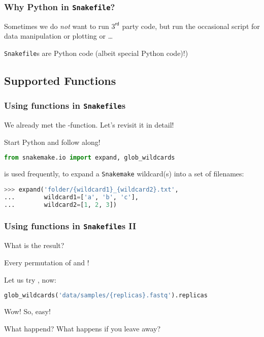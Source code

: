 \begin{frame}
  \frametitle{Why Python in \texttt{Snakefile}?}
  Sometimes we do \emph{not} want to run $3^{\mathsf{rd}}$ party code, but run the occasional script for data manipulation   or plotting or \ldots 
  \pause
  \begin{docs}
  	\texttt{Snakefile}s are Python code (albeit special Python code)!)
  \end{docs}
\end{frame}

\subsection{Supported Functions}

\begin{frame}[fragile]
  \frametitle{Using functions in \texttt{Snakefile}s}
  We already met the -function. Let's revisit it in detail!
  \begin{task}
  	Start Python and follow along!
  \end{task}
  \begin{lstlisting}[language=Python,style=Python]
from snakemake.io import expand, glob_wildcards
  \end{lstlisting}
    is used frequently, to expand a \texttt{Snakemake} wildcard(s) into a set of filenames:
  \begin{lstlisting}[language=Python,style=Python]
>>> expand('folder/{wildcard1}_{wildcard2}.txt',
...        wildcard1=['a', 'b', 'c'],
...        wildcard2=[1, 2, 3])
  \end{lstlisting}
\end{frame}

\begin{frame}[fragile]
  \frametitle{Using functions in \texttt{Snakefile}s II}
  \begin{question}
  	What is the result?
  \end{question}
  \pause
  \begin{hint}[Answer:]
  	Every permutation of  and !
  \end{hint}
  \pause
  Let us try , now:
  \begin{lstlisting}[language=Python,style=Python]
glob_wildcards('data/samples/{replicas}.fastq').replicas
  \end{lstlisting}
  \pause
  Wow! So, easy!
  \begin{question}
  	What happend? What happens if you leave  away?
  \end{question}
\end{frame}

